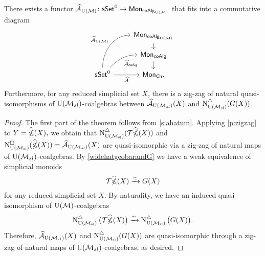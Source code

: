 \begin{nntheorem}
	There exists a functor $\Ahat_\UM \colon \sSet^0 \to \Mon_{\coAlg_\UM}$ that fits into a commutative diagram
	\begin{equation*}
	\begin{tikzcd}[row sep=small]
	& \Mon_{\coAlg_\UM} \arrow[d] \\
	& \Mon_{\coAlg} \arrow[d] \\
	\sSet^0
	\arrow[r, "\Ahat"', ]
	\arrow[ru, "\Ahat_{\coAlg}"', out=45, in=180] 
	\arrow[ruu, "\Ahat_\UM", out=90, in=180]
	& \Mon_{\Ch}.
	\end{tikzcd}
	\end{equation*}
	Furthermore, for any reduced simplicial set $X$, there is a zig-zag of natural quasi-isomorphisms of $\USL$-coalgebras between $\Ahat_\USL(X)$ and $\schainsUSL(G(X))$.
\end{nntheorem}

\begin{proof}
	The first part of the theorem follows from \cref{s:ahatum}.
	Applying \cref{p:zigzag} to $Y= \widehat{\ccobar}(X),$ we obtain that $\schainsUSL (\mathcal{T} \widehat{\ccobar}(X))$ and $\cchainsUSL(\widehat{\ccobar}(X)) = \Ahat_{\USL}(X)$ are quasi-isomorphic via a zig-zag of natural maps of $\USL$-coalgebras.
	By \cref{widehatgcobarandG} we have a weak equivalence of simplicial monoids
	\begin{equation*}
	\mathcal{T}\widehat{\ccobar}(X) \xrightarrow{\simeq} G(X)
	\end{equation*}
	for any reduced simplicial set $X$.
	By naturality, we have an induced quasi-isomorphism of $\UM$-coalgebras
	\begin{equation*}
	\schainsUSL \big( \mathcal{T}\widehat{\ccobar}(X) \big) \xra{\simeq}
	\schainsUSL \big( G(X) \big).
	\end{equation*}
	Therefore, $\Ahat_{\USL}(X)$ and $\schainsUSL(G(X))$ are quasi-isomorphic through a zig-zag of natural maps of $\USL$-coalgebras, as desired.
\end{proof}